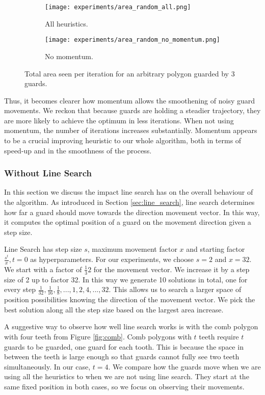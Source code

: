 \begin{figure}[h!]
    \centering
    \begin{subfigure}{0.45\textwidth}
        \texttt{[image: experiments/area\_random\_all.png]}
        \caption{All heuristics.}
        \label{fig:no_momentum1}
    \end{subfigure}
    \begin{subfigure}{0.45\textwidth}
        \texttt{[image: experiments/area\_random\_no\_momentum.png]}
        \caption{No momentum.}
        \label{fig:no_momentum2}
    \end{subfigure}
    \caption{Total area seen per iteration for an arbitrary polygon guarded by 3 guards.}
    \label{fig:no_momentum}
\end{figure}

Thus, it becomes clearer how momentum allows the smoothening of noisy guard movements. We reckon that because guards are holding a steadier trajectory, they are more likely to achieve the optimum in less iterations. When not using momentum, the number of iterations increases substantially. Momentum appears to be a crucial improving heuristic to our whole algorithm, both in terms of speed-up and in the smoothness of the process.

\subsubsection{Without Line Search}
In this section we  discuss the impact line search has on the overall behaviour of the algorithm. As introduced in Section \ref{sec:line_search}, line search determines how far a guard should move towards the direction movement vector. In this way, it computes the optimal position of a guard on the movement direction given a step size.

Line Search has step size $s$, maximum movement factor $x$ and starting factor $\frac{s^t}{x}, t = 0$ as hyperparameters. For our experiments, we choose $s = 2$ and $x = 32$. We start with a factor of $\frac 1 32$ for the movement vector. We  increase it by a step size of 2 up to factor 32.  In this way we generate 10 solutions in total, one for every step $\frac{1}{32}, \frac{1}{16}, \frac 1 8, ..., 1, 2, 4, ..., 32$. This  allows us to search a larger space of position possibilities knowing the direction of the movement vector. We  pick the best solution along all the step size based on the largest area increase. 

A suggestive way to observe how well line search works is with the comb polygon with four teeth from Figure \ref{fig:comb}. Comb polygons with $t$ teeth require $t$ guards to be guarded, one guard for each tooth. This is because the space in between the teeth is large enough so that guards cannot fully see two teeth simultaneously. In our case, $t = 4$. We  compare how the guards move when we are using all the heuristics to when we are not using line search. They  start at the same fixed position in both cases, so we  focus on observing their movements.

